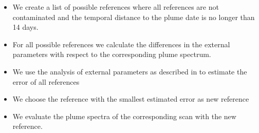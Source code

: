 \documentclass  [
  paper    = a4,
  BCOR     = 10mm,
  twoside,
  fontsize = 12pt,
  fleqn,
  toc      = bibnumbered,
  toc      = listofnumbered,
  numbers  = noendperiod,
  headings = normal,
  listof   = leveldown,
  version  = 3.03
]                                       {scrreprt}
\begin{document}
	\begin{itemize}
		\item We create a list of possible references where all references are not contaminated and the temporal distance to the plume date is no longer than 14 days.
		\item For all possible references we calculate the differences in the external parameters with respect to the corresponding plume spectrum.
		\item We use the analysis of external parameters as described in  to estimate the  error of all references
		\item We choose the reference with the smallest estimated  error as new reference
		\item We evaluate the plume spectra of the corresponding scan with the new reference.
	\end{itemize}
\end{document}
